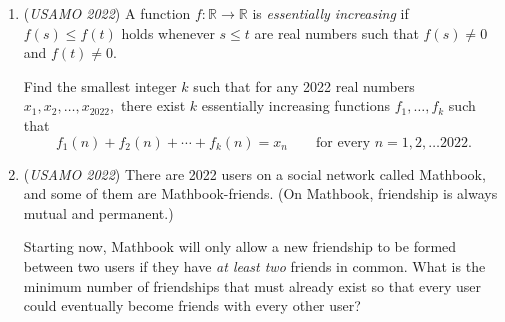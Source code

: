 \begin{enumerate}
 

	\item (\textit{USAMO 2022}) A function $f: \mathbb{R}\to \mathbb{R}$ is \textit{essentially increasing} if $f(s)\leq f(t)$ holds whenever $s\leq t$ are real numbers such that $f(s)\neq 0$ and $f(t)\neq 0$.


 Find the smallest integer $k$ such that for any 2022 real numbers $x_1,x_2,\ldots , x_{2022},$ there exist $k$ essentially increasing functions $f_1,\ldots, f_k$ such that
 \[f_1(n) + f_2(n) + \cdots + f_k(n) = x_n\qquad \text{for every } n= 1,2,\ldots 2022.\]


	\item (\textit{USAMO 2022}) There are 2022 users on a social network called Mathbook, and some of them are Mathbook-friends. (On Mathbook, friendship is always mutual and permanent.)


 Starting now, Mathbook will only allow a new friendship to be formed between two users if they have \textit{at least two} friends in common. What is the minimum number of friendships that must already exist so that every user could eventually become friends with every other user?


 

\end{enumerate}